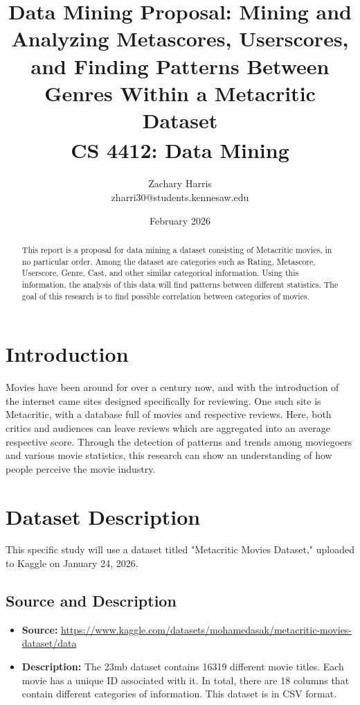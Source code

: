 \documentclass[conference]{IEEEtran}
\begin{document}
\title{Data Mining Proposal: Mining and Analyzing Metascores, Userscores, and Finding Patterns Between Genres Within a Metacritic Dataset\\
{\footnotesize \textsuperscript{} CS 4412: Data Mining}
}
\author{Zachary Harris \\ zharri30@students.kennesaw.edu}
\date{February 2026}


\maketitle

\begin{abstract}
    This report is a proposal for data mining a dataset consisting of Metacritic movies, in no particular order. Among the dataset are categories such as Rating, Metascore, Userscore, Genre, Cast, and other similar categorical information. Using this information, the analysis of this data will find patterns between different statistics. The goal of this research is to find possible correlation between categories of movies.
\end{abstract}

\section{Introduction}
Movies have been around for over a century now, and with the introduction of the internet came sites designed specifically for reviewing. One such site is Metacritic, with a database full of movies and respective reviews. Here, both critics and audiences can leave reviews which are aggregated into an average respective score. Through the detection of patterns and trends among moviegoers and various movie statistics, this research can show an understanding of how people perceive the movie industry.

\section{Dataset Description}
This specific study will use a dataset titled "Metacritic Movies Dataset," uploaded to Kaggle on January 24, 2026.

\subsection{Source and Description}
\begin{itemize}
    \item \textbf{Source:} \url{https://www.kaggle.com/datasets/mohamedasak/metacritic-movies-dataset/data}
    \item \textbf{Description:} The 23mb dataset contains 16319 different movie titles. Each movie has a unique ID associated with it. In total, there are 18 columns that contain different categories of information. This dataset is in CSV format.
\end{itemize}
\end{document}
